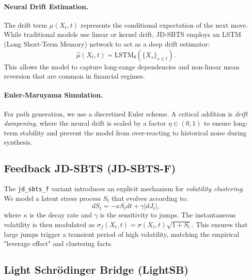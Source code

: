 \documentclass[11pt,a4paper]{article}
\begin{document}
\paragraph{Neural Drift Estimation.}
The drift term $\mu(X_t, t)$ represents the conditional expectation of the next
move. While traditional models use linear or kernel drift, JD-SBTS employs an
LSTM (Long Short-Term Memory) network to act as a deep drift estimator:
\begin{equation}
    \widehat{\mu}(X_t, t) = \text{LSTM}_{\theta}(\{X_s\}_{s \le t}).
\end{equation}
This allows the model to capture long-range dependencies and non-linear mean
reversion that are common in financial regimes.

\paragraph{Euler-Maruyama Simulation.}
For path generation, we use a discretized Euler scheme. A critical addition is
\textit{drift dampening}, where the neural drift is scaled by a factor $\eta \in (0,1)$
to ensure long-term stability and prevent the model from over-reacting to
historical noise during synthesis.

\subsection{Feedback JD-SBTS (JD-SBTS-F)}

The \texttt{jd\_sbts\_f} variant introduces an explicit mechanism for
\textit{volatility clustering}. We model a latent stress process $S_t$ that
evolves according to:
\begin{equation}
    dS_t = -\kappa S_t dt + \gamma |dJ_t|,
\end{equation}
where $\kappa$ is the decay rate and $\gamma$ is the sensitivity to jumps. The
instantaneous volatility is then modulated as $\sigma_{f}(X_t, t) = \sigma(X_t, t)
\sqrt{1 + S_t}$. This ensures that large jumps trigger a transient period of
high volatility, matching the empirical "leverage effect" and clustering facts.

\subsection{Light Schrödinger Bridge (LightSB)}
\end{document}
